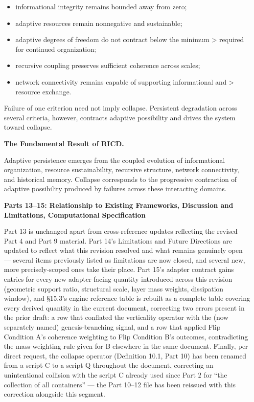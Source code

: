 \documentclass[
]{article}
\begin{document}
\begin{itemize}
\item
  informational integrity remains bounded away from zero;
\item
  adaptive resources remain nonnegative and sustainable;
\item
  adaptive degrees of freedom do not contract below the minimum
  \textgreater{} required for continued organization;
\item
  recursive coupling preserves sufficient coherence across scales;
\item
  network connectivity remains capable of supporting informational and
  \textgreater{} resource exchange.
\end{itemize}

Failure of one criterion need not imply collapse. Persistent degradation
across several criteria, however, contracts adaptive possibility and
drives the system toward collapse.

\textbf{The Fundamental Result of RICD.}

Adaptive persistence emerges from the coupled evolution of informational
organization, resource sustainability, recursive structure, network
connectivity, and historical memory. Collapse corresponds to the
progressive contraction of adaptive possibility produced by failures
across these interacting domains.

\textbf{Parts 13--15: Relationship to Existing Frameworks, Discussion
and Limitations, Computational Specification}

Part 13 is unchanged apart from cross-reference updates reflecting the
revised Part 4 and Part 9 material. Part 14's Limitations and Future
Directions are updated to reflect what this revision resolved and what
remains genuinely open --- several items previously listed as
limitations are now closed, and several new, more precisely-scoped ones
take their place. Part 15's adapter contract gains entries for every new
adapter-facing quantity introduced across this revision (geometric
support ratio, structural scale, layer mass weights, dissipation
window), and §15.3's engine reference table is rebuilt as a complete
table covering every derived quantity in the current document,
correcting two errors present in the prior draft: a row that conflated
the verticality operator with the (now separately named)
genesis-branching signal, and a row that applied Flip Condition A's
coherence weighting to Flip Condition B's outcomes, contradicting the
mass-weighting rule given for B elsewhere in the same document. Finally,
per direct request, the collapse operator (Definition 10.1, Part 10) has
been renamed from a script C to a script Q throughout the document,
correcting an unintentional collision with the script C already used
since Part 2 for ``the collection of all containers'' --- the Part
10--12 file has been reissued with this correction alongside this
segment.
\end{document}
